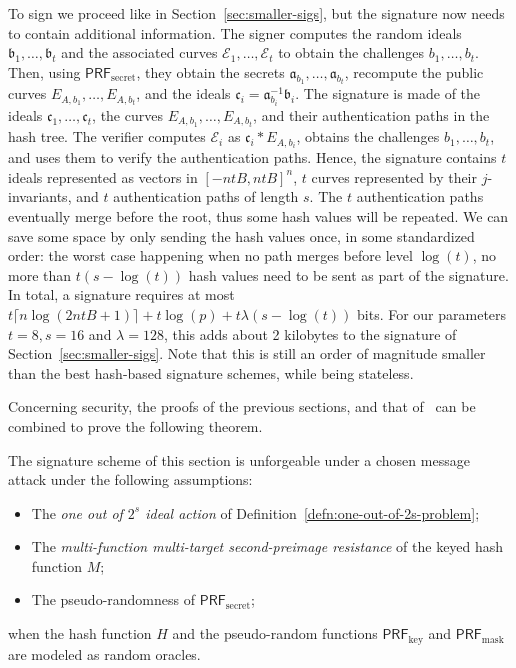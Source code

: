 \documentclass{llncs}
\newcommand{\E}{\mathcal{E}}
\renewcommand{\a}{\mathfrak{a}}
\renewcommand{\b}{\mathfrak{b}}
\renewcommand{\c}{\mathfrak{c}}
\newcommand{\PRF}{\mathsf{PRF}}
\newcommand{\PRFk}{\PRF_{\mathrm{key}}}
\newcommand{\PRFm}{\PRF_{\mathrm{mask}}}
\newcommand{\PRFs}{\PRF_{\mathrm{secret}}}
\begin{document}
To sign we proceed like in Section~\ref{sec:smaller-sigs}, but the signature now needs to contain additional information.
The signer computes the random ideals $\b_1,\dots,\b_t$ and the associated curves $\E_1,\dots,\E_t$ to obtain the challenges $b_1,\dots,b_t$.
Then, using $\PRFs$, they obtain the secrets $\a_{b_1},\dots,\a_{b_t}$, recompute the public curves $E_{A,b_1},\dots,E_{A,b_t}$, and the ideals $\c_i=\a_{b_i}^{-1}\b_i$.
The signature is made of the ideals $\c_1,\dots,\c_t$, the curves $E_{A,b_1},\dots,E_{A,b_t}$, and their authentication paths in the hash tree.
The verifier computes $\E_i$ as $\c_i * E_{A,b_i}$, obtains the challenges $b_1,\dots,b_t$, and uses them to verify the authentication paths.
Hence, the signature contains $t$ ideals represented as vectors in $[-ntB,ntB]^n$, $t$ curves represented by their $j$-invariants, and $t$ authentication paths of length $s$.
The $t$ authentication paths eventually merge before the root, thus some hash values will be repeated.
We can save some space by only sending the hash values once, in some standardized order: the worst case happening when no path merges before level $\log(t)$, no more than $t(s-\log(t))$ hash values need to be sent as part of the signature.
In total, a signature requires at most $t\lceil n \log(2ntB+1)\rceil + t\log(p) + t\lambda(s-\log(t))$ bits.
For our parameters $t=8, s=16$ and $\lambda=128$, this adds about 2 kilobytes to the signature of Section~\ref{sec:smaller-sigs}.
Note that this is still an order of magnitude smaller than the best hash-based signature schemes, while being stateless.

Concerning security, the proofs of the previous sections, and that of~\cite[Appendix~B]{10.1007/978-3-662-49384-7_15} can be combined to prove the following theorem.

\begin{theorem}
  The signature scheme of this section is unforgeable under a chosen
  message attack under the following assumptions:
  \begin{itemize}
  \item The \emph{one out of $2^s$ ideal action} of Definition~\ref{defn:one-out-of-2s-problem};
  \item The \emph{multi-function multi-target second-preimage resistance} of
    the keyed hash function $M$;
  \item The pseudo-randomness of $\PRFs$;
  \end{itemize}
  when the hash function $H$ and the pseudo-random functions $\PRFk$
  and $\PRFm$ are modeled as random oracles.
\end{theorem}
\end{document}
